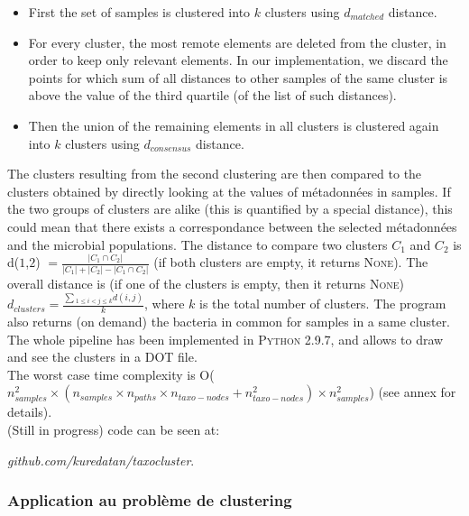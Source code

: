 \documentclass{beamer}
\begin{document}
\begin{frame}
\begin{itemize}
\item First the set of samples is clustered into $k$ clusters using $d_{matched}$ distance. 
\item For every cluster, the most remote elements are deleted from the cluster, in order to keep only relevant elements. In our implementation, we discard the points for which sum of all distances to other samples of the same cluster is above the value of the third quartile (of the list of such distances).
\item Then the union of the remaining elements in all clusters is clustered again into $k$ clusters using $d_{consensus}$ distance.
\end{itemize}

The clusters resulting from the second clustering are then compared to the clusters obtained by directly looking at the values of métadonnées in samples. If the two groups of clusters are alike (this is quantified by a special distance), this could mean that there exists a correspondance between the selected métadonnées and the microbial populations. The distance to compare two clusters \textsc{$C_{1}$} and \textsc{$C_{2}$} is d($1$,$2$) $= \frac{|C_{1} \cap C_{2}|}{|C_{1}| + |C_{2}| - |C_{1} \cap C_{2}|} $ (if both clusters are empty, it returns \textsc{None}). The overall distance is (if one of the clusters is empty, then it returns \textsc{None}) $d_{clusters} = \frac{\sum{_{1 \le i < j \le k}}{d(i,j)}}{k}$, where $k$ is the total number of clusters. The program also returns (on demand) the bacteria in common for samples in a same cluster.\\

The whole pipeline has been implemented in \textsc{Python 2.9.7}, and allows to draw and see the clusters in a DOT file.\\

The worst case time complexity is O($n_{samples}^{2} \times (n_{samples} \times n_{paths} \times n_{taxo-nodes} + n_{taxo-nodes}^{2}) \times n_{samples}^{2}$) (see annex for details).\\

(Still in progress) code can be seen at: \\\begin{center}\emph{github.com/kuredatan/taxocluster}.\end{center}

\end{frame}

\begin{frame}
\frametitle{Application au problème de clustering}
\end{frame}
\end{document}
